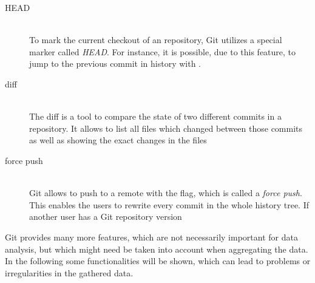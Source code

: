 \begin{description}
    \item[HEAD] \hfill \\
        To mark the current checkout of an repository, Git utilizes a special marker called \emph{HEAD}.
        For instance, it is possible, due to this feature, to jump to the previous commit in history with .

    \item[diff] \hfill \\
        The diff is a tool to compare the state of two different commits in a repository.
        It allows to list all files which changed between those commits as well as showing the exact changes in the files

    \item[force push] \hfill \\
        Git allows to push to a remote with the  flag, which is called a \emph{force push}.
        This enables the users to rewrite every commit in the whole history tree. If another user has a Git repository version
\end{description}


Git provides many more features, which are not necessarily important for data analysis, but which might need be taken into account when aggregating the data.
In the following some functionalities will be shown, which can lead to problems or irregularities in the gathered data.

